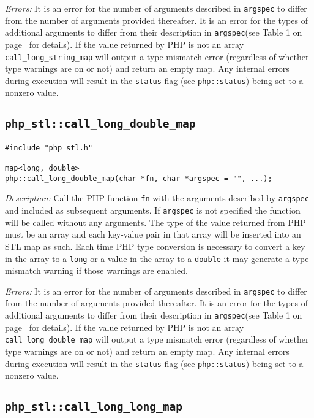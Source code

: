 \documentclass[11pt,titlepage]{article}
\begin{document}
\emph{Errors:} It is an error for the number of arguments described in \verb|argspec| to differ from the number of arguments provided thereafter. It is an error for the types of additional arguments to differ from their description in \verb|argspec|(see Table 1 on page~\pageref{Table1} for details). If the value returned by PHP is not an array \verb|call_long_string_map| will output a type mismatch error (regardless of whether type warnings are on or not) and return an empty map. Any internal errors during execution will result in the \verb|status| flag (see \verb|php::status|) being set to a nonzero value.


\subsection{\texttt{php\_stl::call\_long\_double\_map}}

\begin{verbatim}
#include "php_stl.h"

map<long, double> 
php::call_long_double_map(char *fn, char *argspec = "", ...);
\end{verbatim}

\emph{Description:} Call the PHP function \verb|fn| with the arguments described by \verb|argspec| and included as subsequent arguments. If \verb|argspec| is not specified the function will be called without any arguments. The type of the value returned from PHP must be an array and each key-value pair in that array will be inserted into an STL map as such. Each time PHP type conversion is necessary to convert a key in the array to a \verb|long| or a value in the array to a \verb|double| it may generate a type mismatch warning if those warnings are enabled.

\emph{Errors:} It is an error for the number of arguments described in \verb|argspec| to differ from the number of arguments provided thereafter. It is an error for the types of additional arguments to differ from their description in \verb|argspec|(see Table 1 on page~\pageref{Table1} for details). If the value returned by PHP is not an array \verb|call_long_double_map| will output a type mismatch error (regardless of whether type warnings are on or not) and return an empty map. Any internal errors during execution will result in the \verb|status| flag (see \verb|php::status|) being set to a nonzero value.


\subsection{\texttt{php\_stl::call\_long\_long\_map}}
\end{document}
